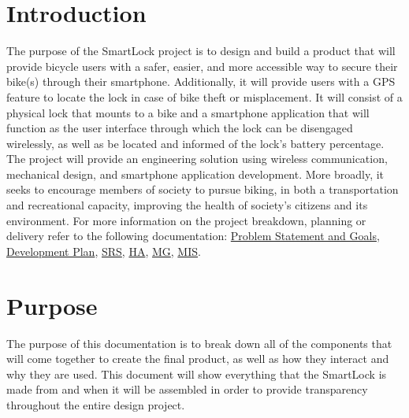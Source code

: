 \documentclass[12pt, titlepage]{article}
\begin{document}

\section{Introduction}
The purpose of the SmartLock project is to design and build a product that will provide bicycle users with a safer, easier, and more accessible way to secure their bike(s) through their smartphone. Additionally, it will provide users with a GPS feature to locate the lock in case of bike theft or misplacement.  It will consist of a physical lock that mounts to a bike and a smartphone application that will function as the user interface through which the lock can be disengaged wirelessly, as well as be located and informed of the lock's battery percentage. The project will provide an engineering solution using wireless communication, mechanical design, and smartphone application development. More broadly, it seeks to encourage members of society to pursue biking, in both a transportation and recreational capacity, improving the health of society’s citizens and its environment.  
For more information on the project breakdown, planning or delivery refer to the following documentation:
 \href{https://github.com/NevoAbigail/Capstone/blob/main/docs/ProblemStatementAndGoals/ProblemStatement.pdf}{Problem Statement and Goals},
 \href{https://github.com/NevoAbigail/Capstone/blob/main/docs/DevelopmentPlan/DevelopmentPlan.pdf}{Development Plan},
 \href{https://github.com/NevoAbigail/Capstone/blob/main/docs/SRS/SRS.pdf}{SRS},
 \href{https://github.com/NevoAbigail/Capstone/blob/main/docs/HazardAnalysis/HazardAnalysis.pdf}{HA},
 \href{https://github.com/NevoAbigail/Capstone/blob/main/docs/Design/SoftArchitecture/MG.pdf}{MG},
 \href{https://github.com/NevoAbigail/Capstone/blob/main/docs/Design/SoftDetailedDes/MIS.pdf}{MIS}.

\section{Purpose}
The purpose of this documentation is to break down all of the components that will come together to create the final product, as well as how they interact and why they are used. This document will show everything that the SmartLock is made from and when it will be assembled in order to provide transparency throughout the entire design project.

\end{document}
